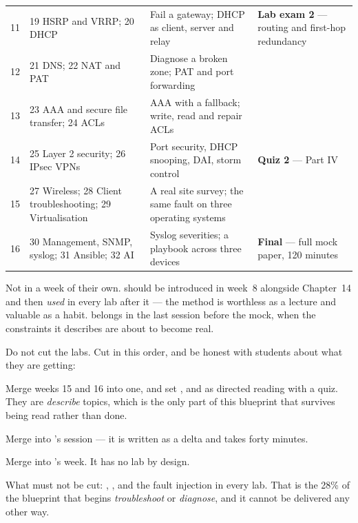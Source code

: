 \begin{longtable}{@{}L{1.5cm}L{5.2cm}L{4.4cm}L{3.6cm}@{}}
11 & 19 HSRP and VRRP; 20 DHCP &
Fail a gateway; DHCP as client, server and relay & \textbf{Lab exam 2} ---
routing and first-hop redundancy \\
12 & 21 DNS; 22 NAT and PAT &
Diagnose a broken zone; PAT and port forwarding & \\
13 & 23 AAA and secure file transfer; 24 ACLs &
AAA with a fallback; write, read and repair ACLs & \\
14 & 25 Layer 2 security; 26 IPsec VPNs &
Port security, DHCP snooping, DAI, storm control & \textbf{Quiz 2} ---
Part IV \\
15 & 27 Wireless; 28 Client troubleshooting; 29 Virtualisation &
A real site survey; the same fault on three operating systems & \\
16 & 30 Management, SNMP, syslog; 31 Ansible; 32 AI &
Syslog severities; a playbook across three devices & \textbf{Final} --- full
mock paper, 120 minutes \\
\bottomrule
\end{longtable}

\begin{conceptbox}
Not in a week of their own.  should be introduced in week~8
alongside Chapter~14 and then \emph{used} in every lab after it --- the method is
worthless as a lecture and valuable as a habit.  belongs in
the last session before the mock, when the constraints it describes are about to
become real.
\end{conceptbox}

\begin{alertbox}
Do not cut the labs. Cut in this order, and be honest with students about what
they are getting:

\begin{tight}
  \item Merge weeks 15 and 16 into one, and set ,
         and  as directed reading with a quiz.
        They are \emph{describe} topics, which is the only part of this blueprint
        that survives being read rather than done.
  \item Merge  into 's session --- it is written as a
        delta and takes forty minutes.
  \item Merge  into 's week. It has no lab by design.
\end{tight}

What must not be cut: , , and the fault
injection in every lab. That is the 28\% of the blueprint that begins
\emph{troubleshoot} or \emph{diagnose}, and it cannot be delivered any other way.
\end{alertbox}

